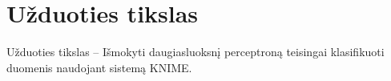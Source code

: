 \section{Užduoties tikslas}
\label{sec:uzduoties_tikslas}

Užduoties tikslas – Išmokyti daugiasluoksnį perceptroną teisingai klasifikuoti duomenis naudojant sistemą
KNIME.